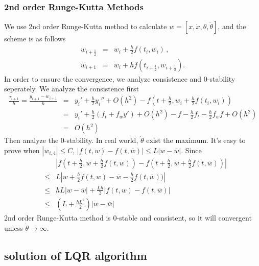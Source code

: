 \documentclass[a4paper,11pt]{article}
\begin{document}
\subsubsection{2nd order Runge-Kutta Methods}
We use 2nd order Runge-Kutta method\cite{burden2011numerical} to calculate $w = [x,\dot x,\theta, \dot \theta]$, and the scheme is as follows
\begin{eqnarray}
	w_{i+\frac{1}{2}} &=& w_{i}+\frac{h}{2}f(t_i,w_i) \, , \nonumber \\
	w_{i+1} &=& w_i+hf(t_{i+\frac{1}{2}},w_{i+\frac{1}{2}}). \label{Eqn:23}
\end{eqnarray}
In order to ensure the convergence, we analyze consistence and 0-stability seperately.
We analyze the consistence first
\begin{eqnarray}
\frac{\tau_{i+1}}{h} = \frac{y_{i+1}-w_{i+1}}{h} &=& {y_i}'+ \frac{h}{2}{y_i}'' + O(h^2)-f(t+\frac{h}{2},w_i+\frac{h}{2}f(t_i,w_i))  \nonumber \\
& =& {y_i}'+\frac{h}{2}(f_t+f_wy')+O(h^2)-f-\frac{h}{2}f_t-\frac{h}{2}f_wf+O(h^2)   \nonumber\\
& =& O(h^2)  \nonumber
\end{eqnarray}
Then analyze the 0-stability. In real world, $\dot \theta$ exist the maximum. It's easy to prove when $|w_{i,4}| \le C $, $|f(t,w)-f(t,\bar{w})| \le L|w-\bar{w}|$. Since
\begin{eqnarray}
	&&|f(t+\frac{h}{2},w+\frac{h}{2}f(t,w))-f(t+\frac{h}{2},\bar w+\frac{h}{2}f(t,\bar w))|   \nonumber\\
	&\le & L|w+\frac{h}{2}f(t,w)-\bar w-\frac{h}{2}f(t,\bar w))|  \nonumber \\
	&\le& hL|w-\bar w|+\frac{Lh}{2}|f(t,w)-f(t,\bar w)|  \nonumber \\
	&\le& (L+\frac{hL^2}{2})|w-\bar w| \nonumber
\end{eqnarray}
2nd order Runge-Kutta method is 0-stable and consistent, so it will convergent unless $\dot \theta \to \infty$.

\subsection{solution of LQR algorithm}
\end{document}

